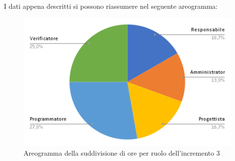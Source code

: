 \pagebreak
I dati appena descritti si possono riassumere nel seguente areogramma:
\begin{figure}[!h]
    \vspace{5px}
    \includegraphics[scale=0.5]{../../../Images/Diagrammi/Diagramma a torta/areogrammaIncremento16.png}
    \centering
    \caption{Areogramma della suddivisione di ore per ruolo dell'incremento 3}
\end{figure}

